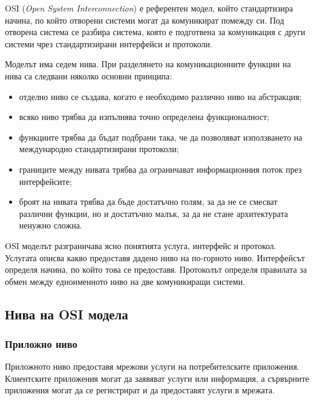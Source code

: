 \begin{defn}
OSI (\emph{Open System Interconnection}) е референтен модел, който стандартизира начина, по който отворени системи могат да комуникират помежду си. Под отворена система се разбира система, която е подготвена за комуникация с други системи чрез стандартизирани интерфейси и протоколи.
\end{defn}

Моделът има седем нива. При разделянето на комуникационните функции на нива са следвани няколко основни принципа:

\begin{itemize}
    \item отделно ниво се създава, когато е необходимо различно ниво на абстракция;
    \item всяко ниво трябва да изпълнява точно определена функционалност;
    \item функциите трябва да бъдат подбрани така, че да позволяват използването на международно стандартизирани протоколи;
    \item границите между нивата трябва да ограничават информационния поток през интерфейсите;
    \item броят на нивата трябва да бъде достатъчно голям, за да не се смесват различни функции, но и достатъчно малък, за да не стане архитектурата ненужно сложна.
\end{itemize}

\begin{defn}
OSI моделът разграничава ясно понятията услуга, интерфейс и протокол. Услугата описва какво предоставя дадено ниво на по-горното ниво. Интерфейсът определя начина, по който това се предоставя. Протоколът определя правилата за обмен между едноименното ниво на две комуникиращи системи.
\end{defn}

\subsection{Нива на OSI модела}\label{s:13.2.2}

\subsubsection{Приложно ниво}

\begin{defn}
Приложното ниво предоставя мрежови услуги на потребителските приложения. Клиентските приложения могат да заявяват услуги или информация, а сървърните приложения могат да се регистрират и да предоставят услуги в мрежата.
\end{defn}

